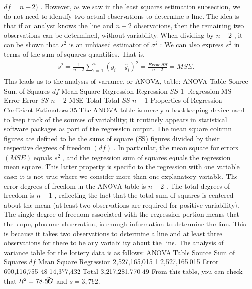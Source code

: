 \documentclass[11pt]{article}
\begin{document}
\(d f=n-2 )\) . However, as we saw in the least squares estimation subsection, we
do not need to identify two actual observations to determine a line. The idea is
 that if an analyst knows the line and \(n-2\) observations, then the remaining two
observations can be determined, without variability. When dividing by \(n-2\) , it
 can be shown that \(s^{2}\) is an unbiased estimator of \(\sigma^{2}\) :
We can also express \(s^{2}\) in terms of the sum of squares quantities. That is,
\[
\begin{aligned} {s^{2}=\frac{1} {n-2} \sum_{i=1}^{n} {( y_{i}-\widehat y_{i} )^{2}}=\frac{E r r o r \ S S} {n-2}=M S E .} \\ \end{aligned}
\]
This leads us to the analysis of variance, or ANOVA, table:
ANOVA Table
Source Sum of Squares \(d f\) Mean Square
Regression Regression \(\mathit{S S}\) \(1 ~\) Regression MS
Error Error \(\mathit{S S}\) \(n-2\) MSE
Total Total \(\mathit{S S}\) \(n-1\)
 Properties of Regression Coeffcient Estimators 35
 The ANOVA table is merely a bookkeeping device used to keep track of the
 sources of variability; it routinely appears in statistical software packages as part
 of the regression output. The mean square column figures are defined to be the
sums of square (SS) figures divided by their respective degrees of freedom \(\left( d f \right)\) .
In particular, the mean square for errors \(( M S E )\) equals \(s^{2}\) , and the regression sum
 of squares equals the regression mean square. This latter property is specific to
 the regression with one variable case; it is not true where we consider more than
 one explanatory variable.
The error degrees of freedom in the ANOVA table is \(n-2\) . The total degrees
of freedom is \(n-1\) , reflecting the fact that the total sum of squares is centered
 about the mean (at least two observations are required for positive variability).
 The single degree of freedom associated with the regression portion means that
the slope, plus one observation, is enough information to determine the line.
This is because it takes two observations to determine a line and at least three
 observations for there to be any variability about the line.
The analysis of variance table for the lottery data is as follows:
ANOVA Table
Source Sum of Squares \(d f\) Mean Square
Regression 2,527,165,015 1 2,527,165,015
Error 690,116,755 48 14,377,432
Total 3,217,281,770 \(4 9\)
From this table, you can check that \(R^{2}=7 8 . 5^{\not\expandafter{\romannumeral1}} \! \! \! \acute{\romannumeral1} \! \! \! \acute{\ G}\) and \(s=3 , 7 9 2 .\)
\end{document}
